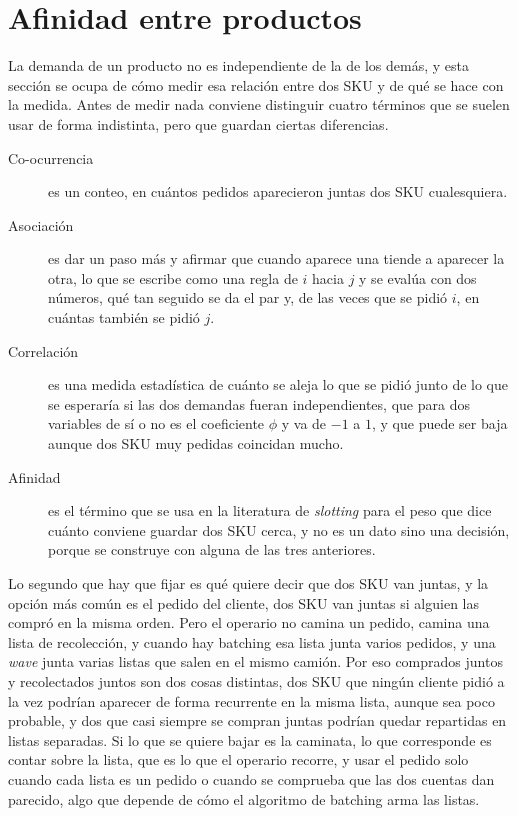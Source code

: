\section{Afinidad entre productos}
\label{sec:afinidad}

La demanda de un producto no es independiente de la de los demás, y esta sección se ocupa de cómo medir esa relación entre dos SKU y de qué se hace con la medida.
Antes de medir nada conviene distinguir cuatro términos que se suelen usar de forma indistinta, pero que guardan ciertas diferencias.
\begin{description}
    \item[Co-ocurrencia] es un conteo, en cuántos pedidos aparecieron juntas dos SKU cualesquiera.
    \item[Asociación] es dar un paso más y afirmar que cuando aparece una tiende a aparecer la otra, lo que se escribe como una regla de $i$ hacia $j$ y se evalúa con dos números, qué tan seguido se da el par y, de las veces que se pidió $i$, en cuántas también se pidió $j$.
    \item[Correlación] es una medida estadística de cuánto se aleja lo que se pidió junto de lo que se esperaría si las dos demandas fueran independientes, que para dos variables de sí o no es el coeficiente $\phi$ y va de $-1$ a $1$, y que puede ser baja aunque dos SKU muy pedidas coincidan mucho.
    \item[Afinidad] es el término que se usa en la literatura de \emph{slotting} para el peso que dice cuánto conviene guardar dos SKU cerca, y no es un dato sino una decisión, porque se construye con alguna de las tres anteriores.
\end{description}

Lo segundo que hay que fijar es qué quiere decir que dos SKU van juntas, y la opción más común es el pedido del cliente, dos SKU van juntas si alguien las compró en la misma orden.
Pero el operario no camina un pedido, camina una lista de recolección, y cuando hay batching esa lista junta varios pedidos, y una \emph{wave} junta varias listas que salen en el mismo camión.
Por eso comprados juntos y recolectados juntos son dos cosas distintas, dos SKU que ningún cliente pidió a la vez podrían aparecer de forma recurrente en la misma lista, aunque sea poco probable, y dos que casi siempre se compran juntas podrían quedar repartidas en listas separadas.
Si lo que se quiere bajar es la caminata, lo que corresponde es contar sobre la lista, que es lo que el operario recorre, y usar el pedido solo cuando cada lista es un pedido o cuando se comprueba que las dos cuentas dan parecido, algo que depende de cómo el algoritmo de batching arma las listas.

